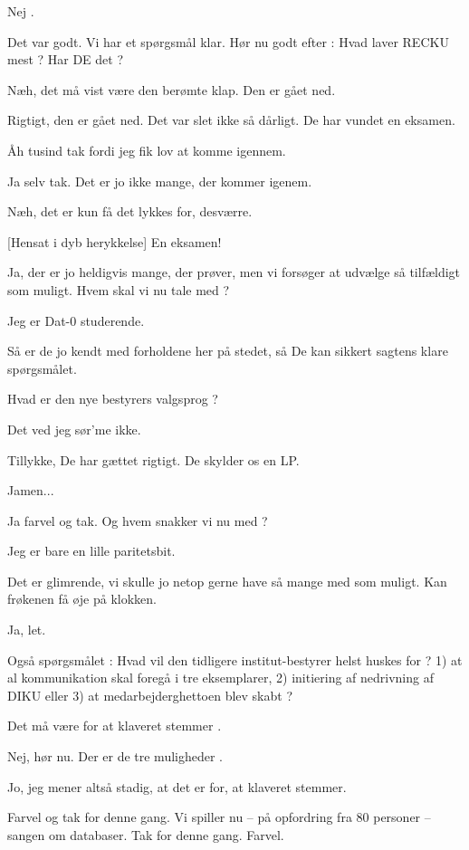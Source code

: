 \documentclass[a4paper,11pt]{article}
\begin{document}
\begin{sketch}
 Nej .

 Det var godt. Vi har et spørgsmål klar. Hør nu godt efter : Hvad
laver RECKU mest ? Har DE det ?

 Næh, det må vist være den berømte klap. Den er gået ned.

 Rigtigt, den er gået ned. Det var slet ikke så dårligt. De har
vundet en eksamen.

 Åh tusind tak fordi jeg fik lov at komme igennem.

 Ja selv tak. Det er jo ikke mange, der kommer igenem.

 Næh, det er kun få det lykkes for, desværre.

[Hensat i dyb herykkelse] En eksamen!

 Ja, der er jo heldigvis mange, der prøver, men vi forsøger at
udvælge så tilfældigt som muligt. Hvem skal vi nu tale med ?

 Jeg er Dat-0 studerende.

 Så er de jo kendt med forholdene her på stedet, så De kan sikkert
sagtens klare spørgsmålet.

 Hvad er den nye bestyrers valgsprog ?

 Det ved jeg sør'me ikke.

 Tillykke, De har gættet rigtigt. De skylder os en LP.

 Jamen...

 Ja farvel og tak. Og hvem snakker vi nu med ?

 Jeg er bare en lille paritetsbit.

 Det er glimrende, vi skulle jo netop gerne have så mange med som
muligt. Kan frøkenen få øje på klokken.

 Ja, let.

 Også spørgsmålet : Hvad vil den tidligere institut-bestyrer helst
huskes for ? 1) at al kommunikation skal foregå i tre eksemplarer, 2) initiering
af nedrivning af DIKU eller 3) at medarbejderghettoen blev skabt ?

 Det må være for at klaveret stemmer .

 Nej, hør nu. Der er de tre muligheder .

 Jo, jeg mener altså stadig, at det er for, at klaveret stemmer.

 Farvel og tak for denne gang. Vi spiller nu -- på
opfordring fra 80 personer -- sangen om databaser. Tak for denne gang. Farvel.

\end{sketch}
\end{document}
